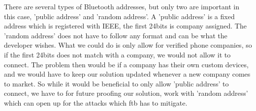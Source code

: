 There are several types of Bluetooth addresses, but only two are important in this case, 'public address' and 'random address'. A 'public address' is a fixed address which is registered with IEEE, the first 24bits is company assigned. The 'random address' does not have to follow any format and can be what the developer wishes\cite{BluetoothBeacon}. What we could do is only allow for verified phone companies, so if the first 24bits does not match with a company, we would not allow it to connect. The problem then would be if a company has their own custom devices, and we would have to keep our solution updated whenever a new company comes to market. So while it would be beneficial to only allow 'public address' to connect, we have to for future proofing our solution, work with 'random address' which can open up for the attacks which \gls{ftb} has to mitigate.